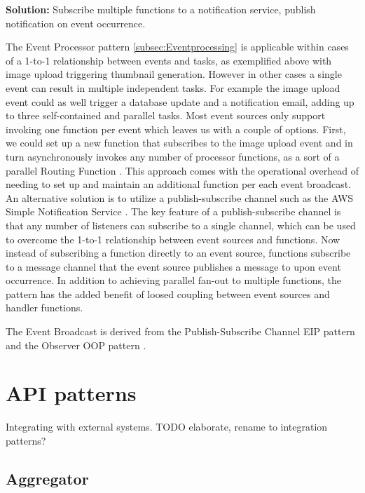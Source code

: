 \textbf{Solution:} Subscribe multiple functions to a notification service, publish notification on event occurrence.

The Event Processor pattern \ref{subsec:Eventprocessing} is applicable within cases of a 1-to-1 relationship between events and tasks, as exemplified above with image upload triggering thumbnail generation. However in other cases a single event can result in multiple independent tasks. For example the image upload event could as well trigger a database update and a notification email, adding up to three self-contained and parallel tasks. Most event sources only support invoking one function per event which leaves us with a couple of options. First, we could set up a new function that subscribes to the image upload event and in turn asynchronously invokes any number of processor functions, as a sort of a parallel Routing Function \label{subsec:routingFunction}. This approach comes with the operational overhead of needing to set up and maintain an additional function per each event broadcast. An alternative solution is to utilize a publish-subscribe channel such as the AWS Simple Notification Service \parencite{awslambda0218}. The key feature of a publish-subscribe channel is that any number of listeners can subscribe to a single channel, which can be used to overcome the 1-to-1 relationship between event sources and functions. Now instead of subscribing a function directly to an event source, functions subscribe to a message channel that the event source publishes a message to upon event occurrence. In addition to achieving parallel fan-out to multiple functions, the pattern has the added benefit of loosed coupling between event sources and handler functions. \parencite{sbarski2017serverless}

The Event Broadcast is derived from the Publish-Subscribe Channel EIP pattern \parencite{hohpe2004enterprise} and the Observer OOP pattern \parencite{gamma94designPatterns}. %

\section{API patterns} \label{sec:apiPatterns}

Integrating with external systems.
TODO elaborate, rename to integration patterns?

\subsection{Aggregator} \label{subsec:aggregator}


